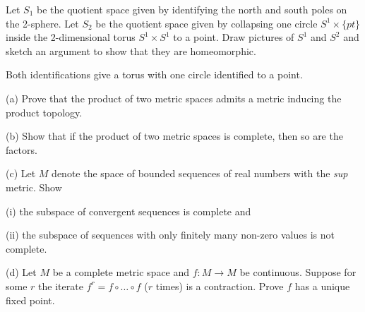 \begin{problem}
Let $S_1$ be the quotient space given by identifying the north and south poles on the 2-sphere. Let $S_2$ be the quotient space given by collapsing one circle $S^1\times \{pt\}$ inside the 2-dimensional torus $S^1 \times S^1$ to a point. Draw pictures of $S^1$ and $S^2$ and sketch an argument to show that they are homeomorphic.
\end{problem}

\begin{solution}[\bf Solution.]


Both identifications give a torus with one circle identified to a point.
\end{solution}


\begin{problem}
\ben
\item [(a)] Prove that the product of two metric spaces admits a metric inducing the product topology.
\item [(b)] Show that if the product of two metric spaces is complete, then so are the factors.
\item [(c)] Let $M$ denote the space of bounded sequences of real numbers with the \emph{sup} metric. Show
\ben
\item [(i)] the subspace of convergent sequences is complete and
\item [(ii)] the subspace of sequences with only finitely many non-zero values is not complete.
\een
\item [(d)] Let $M$ be a complete metric space and $f : M \to M$ be continuous. Suppose for some $r$ the iterate $f^r = f \circ \dots \circ f$ ($r$ times) is a contraction. Prove $f$ has a unique fixed point.
\een
\end{problem}

